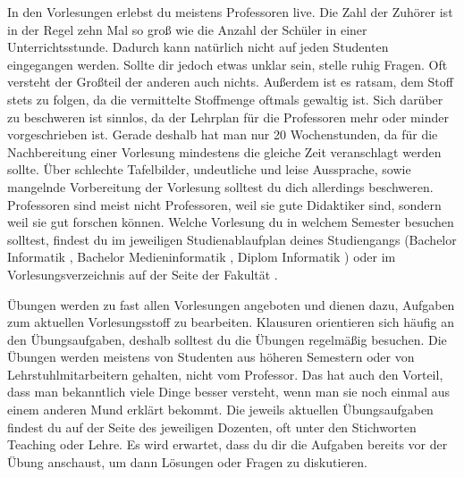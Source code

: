 
In den Vorlesungen erlebst du meistens Professoren live.
Die Zahl der Zuhörer ist in der Regel zehn Mal so groß wie die Anzahl der Schüler in einer Unterrichtsstunde. Dadurch kann natürlich nicht auf jeden Studenten eingegangen werden.
Sollte dir jedoch etwas unklar sein, stelle ruhig Fragen. Oft versteht der Großteil der anderen auch nichts.
Außerdem ist es ratsam, dem Stoff stets zu folgen, da die vermittelte Stoffmenge oftmals gewaltig ist. Sich darüber zu beschweren ist sinnlos, da der Lehrplan für die Professoren mehr oder minder vorgeschrieben ist.
Gerade deshalb hat man nur 20 Wochenstunden, da für die Nachbereitung einer Vorlesung mindestens die gleiche Zeit veranschlagt werden sollte.
Über schlechte Tafelbilder, undeutliche und leise Aussprache, sowie mangelnde Vorbereitung der Vorlesung solltest du dich allerdings beschweren.
Professoren sind meist nicht Professoren, weil sie gute Didaktiker sind, sondern weil sie gut forschen können.
Welche Vorlesung du in welchem Semester besuchen solltest, findest du im jeweiligen Studienablaufplan deines Studiengangs
(Bachelor Informatik , Bachelor Medieninformatik , Diplom Informatik ) oder im Vorlesungsverzeichnis auf der Seite der Fakultät .



Übungen werden zu fast allen Vorlesungen angeboten und dienen dazu, Aufgaben zum aktuellen Vorlesungsstoff zu bearbeiten. Klausuren orientieren sich häufig an den Übungsaufgaben, deshalb solltest du die Übungen
regelmäßig besuchen. Die Übungen werden meistens von Studenten aus höheren Semestern oder von Lehrstuhlmitarbeitern gehalten, nicht vom Professor.
Das hat auch den Vorteil, dass man bekanntlich viele Dinge besser versteht, wenn man sie noch einmal aus einem anderen Mund erklärt bekommt.
Die jeweils aktuellen Übungsaufgaben findest du auf der Seite des jeweiligen Dozenten, oft unter den Stichworten Teaching oder Lehre.
Es wird erwartet, dass du dir die Aufgaben bereits vor der Übung anschaust, um dann Lösungen oder Fragen zu diskutieren.



